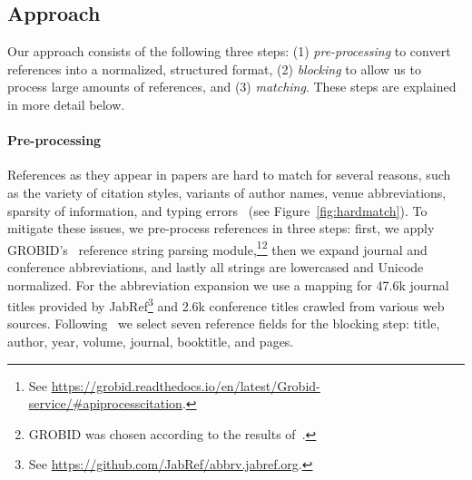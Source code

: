 
\subsection{Approach}

Our approach consists of the following three steps: (1) \emph{pre-processing} to convert references into a normalized, structured format, (2) \emph{blocking} to allow us to process large amounts of references, and (3) \emph{matching}. These steps are explained in more detail below.


\paragraph{Pre-processing}
References as they appear in papers are hard to match for several reasons, such as the variety of citation styles, variants of author names, venue abbreviations, sparsity of information, and typing errors~\cite{Christen2012} (see Figure~\ref{fig:hardmatch}). To mitigate these issues, we pre-process references in three steps: first, we apply GROBID's~\cite{Lopez2009} reference string parsing module,\footnote{See \url{https://grobid.readthedocs.io/en/latest/Grobid-service/\#apiprocesscitation}.}\footnote{GROBID was chosen according to the results of~\cite{Tkaczyk2018}.} then we expand journal and conference abbreviations, and lastly all strings are lowercased and Unicode normalized. For the abbreviation expansion we use a mapping for 47.6k journal titles provided by JabRef\footnote{See \url{https://github.com/JabRef/abbrv.jabref.org}.} and 2.6k conference titles crawled from various web sources. Following~\cite{Koo2011} we select seven reference fields for the blocking step: title, author, year, volume, journal, booktitle, and pages.

